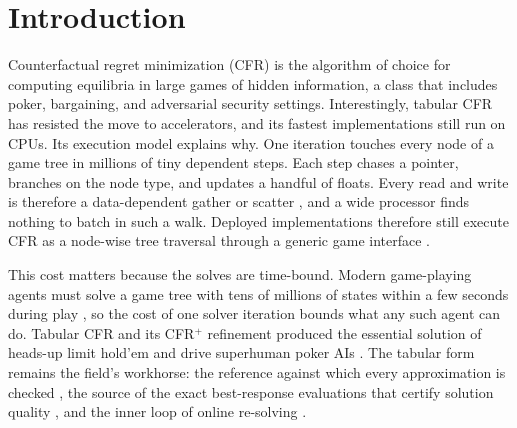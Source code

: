 \section{Introduction}
\label{sec:intro}

Counterfactual regret minimization (CFR) \cite{zinkevich2007regret} is the algorithm
of choice for computing equilibria in large games of hidden information, a class that
includes poker, bargaining, and adversarial security settings. Interestingly, tabular
CFR has resisted the move to accelerators, and its fastest implementations still run
on CPUs. Its execution
model explains why. One iteration touches every node of a game tree in millions of tiny
dependent steps. Each step chases a pointer, branches on the node type, and updates a
handful of floats. Every read and write is therefore a data-dependent gather or scatter
\cite{kim2026parallelizing}, and a wide processor finds nothing to batch in such a
walk. Deployed implementations therefore still execute CFR as a node-wise tree
traversal through a generic game interface
\cite{lanctot2019openspiel,liu2024liteefg,steinberger2019pokerrl,li2026real}.

This cost matters because the solves are time-bound. Modern game-playing agents must
solve a game tree with tens of millions of states within a few seconds during play
\cite{burch2014solving,ganzfried2015endgame,moravcik2016refining,brown2017safe,moravvcik2017deepstack,brown2018superhuman,brown2019superhuman,vsustr2019monte,brown2018depth,steinberger2019pokerrl},
so the cost of one solver iteration bounds what any such agent can do. Tabular CFR and
its CFR$^{+}$ refinement \cite{tammelin2014solving} produced the essential solution of
heads-up limit hold'em \cite{bowling2015heads,tammelin2015solving} and drive
superhuman poker AIs
\cite{brown2018superhuman,moravvcik2017deepstack,brown2019superhuman}. The tabular form
remains the field's workhorse: the reference against which every approximation is
checked \cite{lanctot2009monte,brown2019deep,schmid2019variance}, the source of the
exact best-response evaluations that certify solution quality
\cite{johanson2011accelerating,li2026av,li2026agents}, and the inner loop of online re-solving
\cite{burch2014solving,brown2017safe,sustr2020sound,li2025efficient,li2026real}.

